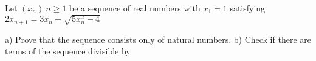 Let $(x_{n}) \ n\geq 1$ be a sequence of real numbers with $x_{1}=1$ satisfying $2x_{n+1}=3x_{n}+\sqrt{5x_{n}^{2}-4}$

a) Prove that the sequence consists only of natural numbers.
b) Check if there are terms of the sequence divisible by 